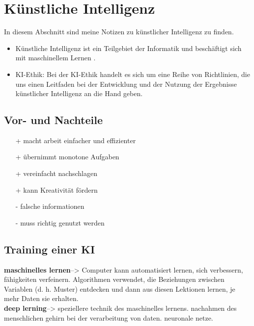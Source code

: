 \section{Künstliche Intelligenz}
\label{sec:ai}

In diesem Abschnitt sind meine Notizen zu künstlicher Intelligenz zu finden.

\begin{itemize}
    \item Künstliche Intelligenz ist ein Teilgebiet der Informatik und beschäftigt sich mit maschinellem Lernen \citep{ai-wikipedia}.
    \item KI-Ethik: Bei der KI-Ethik handelt es sich um eine Reihe von Richtlinien, die uns einen Leitfaden bei der Entwicklung und der Nutzung der Ergebnisse künstlicher Intelligenz an die Hand geben. \citep{ibm}
\end{itemize}

\subsection{Vor- und Nachteile} \citep{GitHub}
\begin{itemize}
    \item[+] macht arbeit einfacher und effizienter
    \item[+] übernimmt monotone Aufgaben
    \item[+] vereinfacht nachschlagen
    \item[+] kann Kreativität fördern
    \item[-] falsche informationen
    \item[-] muss richtig genutzt werden
\end{itemize}

\bigskip

\subsection{Training einer KI }
\citep{KI-Training}
\textbf{maschinelles lernen}--> Computer kann automatisiert lernen, sich verbessern, fähigkeiten verfeinern.
Algorithmen verwendet, die Beziehungen zwischen Variablen (d. h. Muster) entdecken und dann aus diesen Lektionen lernen, je mehr Daten sie erhalten.\\
\textbf{deep lerning}--> speziellere technik des maschinelles lernens. nachahmen des menschlichen gehirn bei der verarbeitung von daten. neuronale netze.\\


